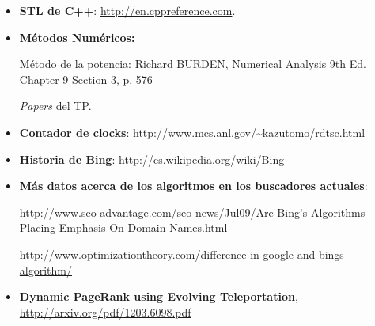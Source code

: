 \begin{itemize}
	\item \textbf{STL de C++}: \url{http://en.cppreference.com}.
	\item \textbf{Métodos Numéricos:}
		\par Método de la potencia: Richard BURDEN, Numerical Analysis 9th Ed. Chapter 9 Section 3, p. 576
		\par \textit{Papers} del TP.
	\item \textbf{Contador de clocks}: \url{http://www.mcs.anl.gov/\~kazutomo/rdtsc.html}
	\item \textbf{Historia de Bing}: \url{http://es.wikipedia.org/wiki/Bing}
	\item \textbf{Más datos acerca de los algoritmos en los buscadores actuales}:
			\par \url{http://www.seo-advantage.com/seo-news/Jul09/Are-Bing's-Algorithms-Placing-Emphasis-On-Domain-Names.html}
			\par \url{http://www.optimizationtheory.com/difference-in-google-and-bings-algorithm/}
	\item \textbf{Dynamic PageRank using Evolving Teleportation}, \url{http://arxiv.org/pdf/1203.6098.pdf}
\end{itemize}



